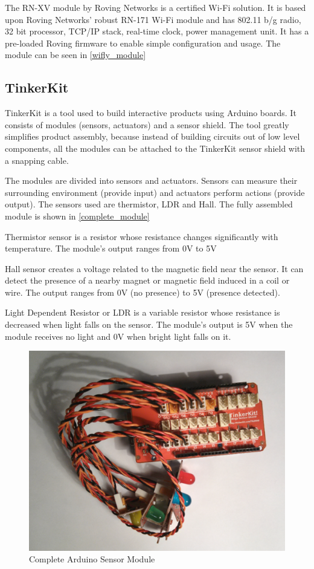 The RN-XV module \cite{rn_xv_module} by Roving Networks is a certified Wi-Fi solution. It is based upon Roving Networks' robust RN-171 Wi-Fi module and has 802.11 b/g radio, 32 bit processor, TCP/IP stack, real-time clock, power management unit. It has a pre-loaded Roving firmware to enable simple configuration and usage. The module can be seen in \autoref{wifly_module}

\subsection{TinkerKit}

TinkerKit \cite{tinkerkit_introduction} is a tool used to build interactive products using Arduino boards. It consists of modules (sensors, actuators) and a sensor shield. The tool greatly simplifies product assembly, because instead of building circuits out of low level components, all the modules can be attached to the TinkerKit sensor shield with a snapping cable.

The modules are divided into sensors and actuators. Sensors can measure their surrounding environment (provide input) and actuators perform actions (provide output). The sensors used are thermistor, LDR and Hall. The fully assembled module is shown in \autoref{complete_module}

Thermistor sensor \cite{thermistor_sensor} is a resistor whose resistance changes significantly with temperature. The module's output ranges from 0V to 5V

Hall sensor \cite{hall_sensor} creates a voltage related to the magnetic field near the sensor. It can detect the presence of a nearby magnet or magnetic field induced in a coil or wire. The output ranges from 0V (no presence) to 5V (presence detected). 

Light Dependent Resistor or LDR \cite{light_sensor} is a variable resistor whose resistance is decreased when light falls on the sensor. The module's output is 5V when the module receives no light and 0V when bright light falls on it.

\begin{figure}[h!]
\centering
\includegraphics[scale=0.58]{2/figures/complete_module.pdf}
\caption{Complete Arduino Sensor Module}
\label{complete_module}
\end{figure}	


